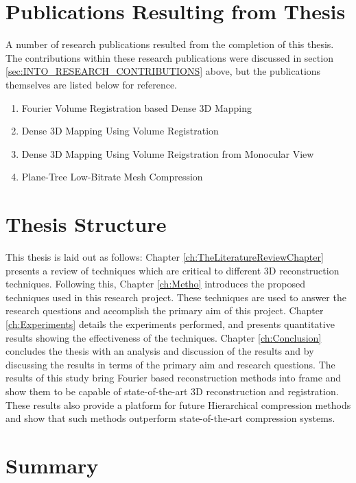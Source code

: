 \section{Publications Resulting from Thesis}

A number of research publications resulted from the completion of this thesis. The contributions within these research publications were discussed in section \ref{sec:INTO_RESEARCH_CONTRIBUTIONS} above, but the publications themselves are listed below for reference.

\begin{enumerate}
  \item Fourier Volume Registration based Dense 3D Mapping \cite{Lincoln16Fourier}
  \item Dense 3D Mapping Using Volume Registration \cite{Lincoln16Dense}
  \item Dense 3D Mapping Using Volume Reigstration from Monocular View \cite{Lincoln16Monocular}
  \item Plane-Tree Low-Bitrate Mesh Compression \cite{Lincoln15Plane}
\end{enumerate}

\section{Thesis Structure}

This thesis is laid out as follows: Chapter \ref{ch:TheLiteratureReviewChapter} presents a review of techniques which are critical to different 3D reconstruction techniques. Following this, Chapter \ref{ch:Metho} introduces the proposed techniques used in this research project. These techniques are used to answer the research questions and accomplish the primary aim of this project. Chapter \ref{ch:Experiments} details the experiments performed, and presents quantitative results showing the effectiveness of the techniques. Chapter \ref{ch:Conclusion} concludes the thesis with an analysis and discussion of the results and by discussing the results in terms of the primary aim and research questions. The results of this study bring Fourier based reconstruction methods into frame and show them to be capable of state-of-the-art 3D reconstruction and registration. These results also provide a platform for future Hierarchical compression methods and show that such methods outperform state-of-the-art compression systems.

\section{Summary}

